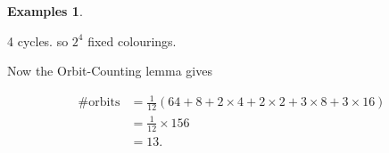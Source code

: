 \documentclass{article}
\theoremstyle{definition}
\newtheorem*{exmps}{Examples}
\begin{document}
\begin{exmps}
\begin{itemize}
\begin{figure}[h]
         \label{fig:necklace1}
       \end{figure}
       

       4 cycles. so $2^4$ fixed colourings.

       
       Now the Orbit-Counting lemma gives

       \begin{align*}
         \# \text{orbits} &= \frac{1}{12}(64 + 8 + 2\times4 + 2\times 2 + 3 \times 8 + 3 \times 16)\\ 
       &= \frac{1}{12}\times 156 \\
       &= 13.
       \end{align*}
  \end{itemize}
\end{exmps}

 
\end{document}
